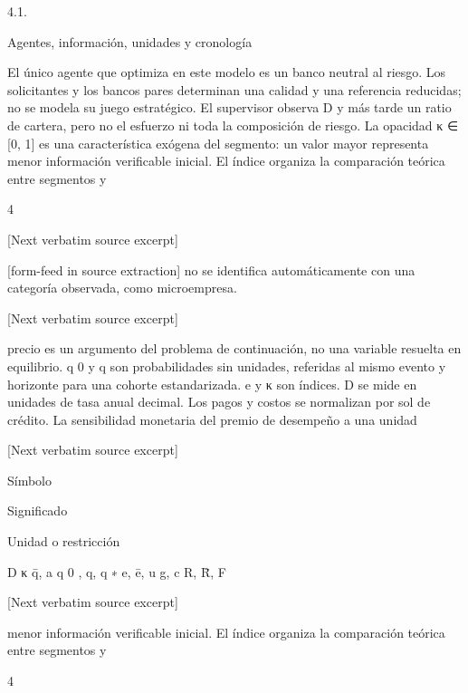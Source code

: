\documentclass[10pt]{article}
\begin{document}
\begin{ReviewVerbatim}
4.1.

Agentes, información, unidades y cronología

El único agente que optimiza en este modelo es un banco neutral al riesgo. Los solicitantes y los
bancos pares determinan una calidad y una referencia reducidas; no se modela su juego estratégico.
El supervisor observa D y más tarde un ratio de cartera, pero no el esfuerzo ni toda la composición de
riesgo. La opacidad κ ∈ [0, 1] es una característica exógena del segmento: un valor mayor representa
menor información veriﬁcable inicial. El índice organiza la comparación teórica entre segmentos y

4

[Next verbatim source excerpt]



[form-feed in source extraction]
no se identiﬁca automáticamente con una categoría observada, como microempresa.

[Next verbatim source excerpt]

precio es un argumento del problema de continuación, no una variable resuelta en equilibrio.
q 0 y q son probabilidades sin unidades, referidas al mismo evento y horizonte para una cohorte
estandarizada. e y κ son índices. D se mide en unidades de tasa anual decimal. Los pagos y costos
se normalizan por sol de crédito. La sensibilidad monetaria del premio de desempeño a una unidad

[Next verbatim source excerpt]

Símbolo

Signiﬁcado

Unidad o restricción

D
κ
q̄, a
q 0 , q, q ∗
e, ē, u
g, c
R, R̄, F


[Next verbatim source excerpt]

menor información veriﬁcable inicial. El índice organiza la comparación teórica entre segmentos y

4



\end{ReviewVerbatim}
\end{document}
